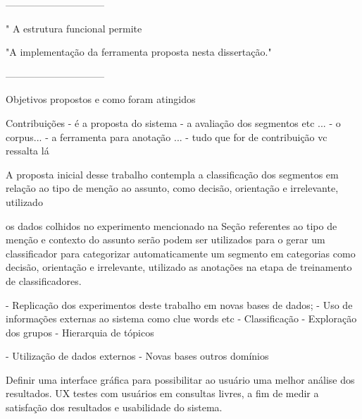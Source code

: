 ------------------------------



" A estrutura funcional permite

"A implementação da ferramenta proposta nesta dissertação."



------------------------------



Objetivos propostos e como foram atingidos





Contribuições	
	- é a proposta do sistema 
	- a avaliação dos segmentos etc ... 
	- o corpus... 
	- a ferramenta para anotação ... 
	- tudo que for de contribuição vc ressalta lá 




	A proposta inicial desse trabalho contempla a classificação dos segmentos em relação ao tipo de menção ao assunto, como decisão, orientação e irrelevante, utilizado 

	os dados colhidos no experimento mencionado na Seção referentes ao tipo de menção e contexto do assunto serão podem ser utilizados para o gerar um classificador para categorizar automaticamente um segmento em categorias como decisão, orientação e irrelevante, utilizado as anotações na etapa de treinamento de classificadores.




	- Replicação dos experimentos deste trabalho em novas bases de dados;
	- Uso de informações externas ao sistema como clue words etc
	- Classificação
	- Exploração dos grupos
	- Hierarquia de tópicos


	- Utilização de dados externos
	- Novas bases outros domínios



Definir uma interface gráfica para possibilitar ao usuário
uma melhor análise dos resultados. {UX} testes com usuários em consultas livres, a fim de medir a satisfação dos resultados e usabilidade do sistema.



























